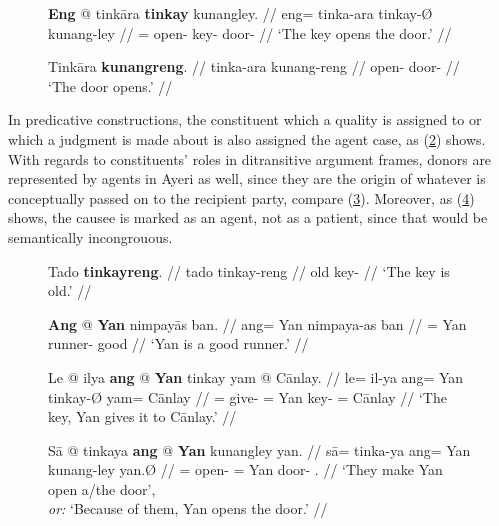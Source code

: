 \begin{figure}
\pex\label{ex:agtmarking2}
\a\begingl
	\gla \textbf{Eng} @ tinkāra \textbf{tinkay} kunangley. //
	\glb eng= tinka-ara tinkay-Ø kunang-ley //
	\glc \AgtTI{}= open-\TsgI{} key-\Top{} door-\PargI{} //
	\glft `The key opens the door.' //
\endgl

\a\begingl
	\gla Tinkāra \textbf{kunangreng}. //
	\glb tinka-ara kunang-reng //
	\glc open-\TsgI{} door-\AargI{} //
	\glft `The door opens.' //
\endgl
\xe
\end{figure}

In predicative constructions, the constituent which a quality is assigned to or
which a judgment is made about is also assigned the agent case, as
(\ref{ex:prednpagt}) shows. With regards to constituents' roles in ditransitive
argument frames, donors are represented by agents in Ayeri as well, since they
are the origin of whatever is conceptually passed on to the recipient party,
compare (\ref{ex:ditragt}). Moreover, as (\ref{ex:causagt}) shows, the causee
is marked as an agent, not as a patient, since that would be semantically
incongrouous.

\begin{figure}[h]
\pex\label{ex:prednpagt}
\a\begingl
	\gla Tado \textbf{tinkayreng}. //
	\glb tado tinkay-reng //
	\glc old key-\AargI{} //
	\glft `The key is old.' //
\endgl

\a\begingl
	\gla \textbf{Ang} @ \textbf{Yan} nimpayās ban. //
	\glb ang= Yan nimpaya-as ban //
	\glc \Aarg{}= Yan runner-\Parg{} good //
	\glft `Yan is a good runner.' //
\endgl
\xe
\end{figure}

\begin{figure}[h]
\ex\label{ex:ditragt}%
\begingl
	\gla Le @ ilya \textbf{ang} @ \textbf{Yan} tinkay yam @ Cānlay. //
	\glb le= il-ya ang= Yan tinkay-Ø yam= Cānlay //
	\glc \PatT{}= give-\TsgM{} \Aarg{}= Yan key-\Top{} \Dat{}= Cānlay //
	\glft `The key, Yan gives it to Cānlay.' //
\endgl\xe
\end{figure}

\begin{figure}[h]
\ex\label{ex:causagt}
\begingl
	\gla Sā @ tinkaya \textbf{ang} @ \textbf{Yan} kunangley yan. //
	\glb sā= tinka-ya ang= Yan kunang-ley yan.Ø //
	\glc \CauT{}= open-\TsgM{} \Aarg{}= Yan door-\PargI{} \TsgM{}.\Top{} //
	\glft `They make Yan open a/the door',\\
		\textit{or:} `Because of them, Yan opens the door.' //
\endgl
\xe
\end{figure}

